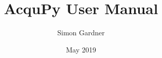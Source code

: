 \documentclass[12pt]{article}
\begin{document}
\title{AcquPy User Manual}
\author{Simon Gardner}
\date{May 2019}
\thispagestyle{empty}
\maketitle
\tableofcontents
\newpage
\setcounter{page}{1}



\end{document}
